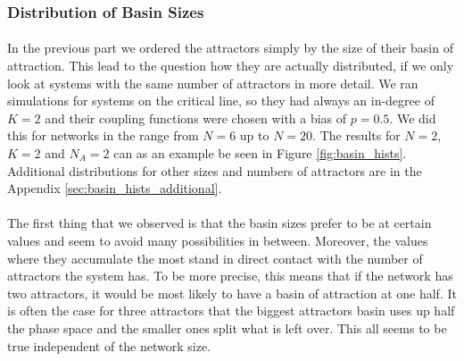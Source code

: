 \subsubsection{Distribution of Basin Sizes}
\paragraph*{}
In the previous part we ordered the attractors simply by the size of their basin of attraction. This lead to the question how they are actually distributed, if we only look at systems with the same number of attractors in more detail. We ran simulations for systems on the critical line, so they had always an in-degree of $ K = 2 $ and their coupling functions were chosen with a bias of $ p = 0.5 $. We did this for networks in the range from $ N = 6 $ up to $ N = 20 $. The results for $N=2$, $K=2$ and $N_A = 2$ can as an example be seen in Figure \ref{fig:basin_hists}. Additional distributions for other sizes and numbers of attractors are in the Appendix \ref{sec:basin_hists_additional}.

\paragraph*{}
The first thing that we observed is that the basin sizes prefer to be at certain values and seem to avoid many possibilities in between. Moreover, the values where they accumulate the most stand in direct contact with the number of attractors the system has. To be more precise, this means that if the network has two attractors, it would be most likely to have a basin of attraction at one half. It is often the case for three attractors that the biggest attractors basin uses up half the phase space and the smaller ones split what is left over. This all seems to be true independent of the network size.
                           
